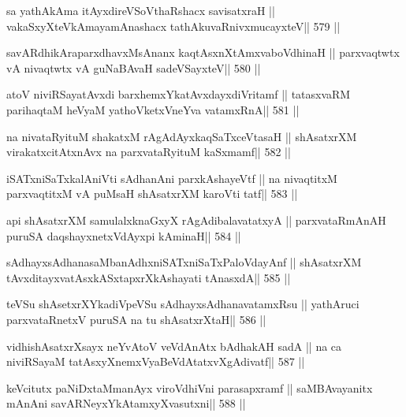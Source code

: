 \begin{shl}
sa yathAkAma itAyxdireVSoV\s thaRshacx savisatxraH ||
vakaSxyXteV\s kAmayamAnashacx tathA\s kuvaRnivxmucayxteV\hfill || 579 ||
\end{shl}

\begin{shl}
savARdhikAraparxdhavxMsAnanx kaqtAsxnXtAmxvaboVdhinaH ||
parxvaqtwtx vA nivaqtwtx vA guNaBAvaH sadeVSayxteV\hfill || 580 ||
\end{shl}

\begin{shl}
atoV niviRSayatAvxdi barxhemxYkatAvxdayxdiVritamf ||
tatasxvaRM parihaqtaM heVyaM yathoVketxVneYva vatamxRnA\hfill || 581 ||
\end{shl}

\begin{shl}
na nivataRyituM shakatxM rAgAdAyxkaqSaTxceVtasaH ||
shAsatxrXM virakatxcitAtxnAvx na parxvataRyituM kaSxmamf\hfill || 582 ||
\end{shl}

\begin{shl}
iSATxniSaTxkalAniVti sAdhanAni parxkAshayeVtf ||
na nivaqtitxM parxvaqtitxM vA puMsaH shAsatxrXM karoVti tatf\hfill || 583 ||
\end{shl}

\begin{shl}
api shAsatxrXM samulalxknaGxyX rAgAdibalavatatxyA ||
parxvataRmAnAH puruSA daqshayxnetxV\s dAyxpi kAminaH\hfill || 584 ||
\end{shl}

\begin{shl}
sAdhayxsAdhanasaMbanAdhxniSATxniSaTxPaloVdayAnf ||
shAsatxrXM tAvxditayxvatAsxkASxtapxrXkAshayati tAnasxdA\hfill || 585 ||
\end{shl}

\begin{shl}
teVSu shAsetxrXYkadiVpeVSu sAdhayxsAdhanavatamxRsu ||
yathAruci parxvataRnetxV puruSA na tu shAsatxrXtaH\hfill || 586 ||
\end{shl}

\begin{shl}
vidhishAsatxrXsayx neYvAtoV veVdAnAtx bAdhakAH sadA ||
na ca niviRSayaM tatAsxyXnemxVyaBeVdAtatxvXgAdivatf\hfill || 587 ||
\end{shl}

\begin{shl}
keVcitutx paNiDxtaMmanAyx viroVdhiVni parasapxramf ||
saMBAvayanitx mAnAni savARNeyxYkAtamxyXvasutxni\hfill || 588 ||
\end{shl}

